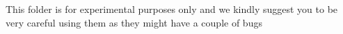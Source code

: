 This folder is for experimental purposes only and we kindly suggest you to be very careful using them as they might have a couple of bugs 